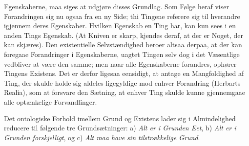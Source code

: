 \documentclass[12pt]{book}
\begin{document}
Egenskaberne, maa siges at udgjøre disses Grundlag. Som Følge heraf viser
Forandringen sig nu ogsaa fra en ny Side; thi Tingene referere sig til hverandre
igjennem deres Egenskaber. Hvilken Egenskab en Ting har, kan kun sees i en anden
Tings Egenskab. (At Kniven er skarp, kjendes deraf, at der er Noget, der kan
skjæres). Den existentielle Selvstændighed beroer altsaa derpaa, at der kan foregaae
Forandringer i Egenskaberne, uagtet Tingen selv dog i det Væsentlige vedbliver at
være den samme; men naar alle Egenskaberne forandres, ophører Tingens Existens. Det
er derfor ligesaa eensidigt, at antage en Mangfoldighed af Ting, der skulde holde sig
aldeles ligegyldige mod enhver Forandring (Herbarts Realia), som at forsvare den
Sætning, at enhver Ting skulde kunne gjennemgaae alle optænkelige Forvandlinger.

Det ontologiske Forhold imellem Grund og Existens lader sig i Almindelighed reducere
til følgende tre Grundsætninger: a) \emph{Alt er i Grunden Eet}, b) \emph{Alt er i
Grunden forskjelligt}, og c) \emph{Alt maa have sin tilstrækkelige Grund}.
\end{document}
